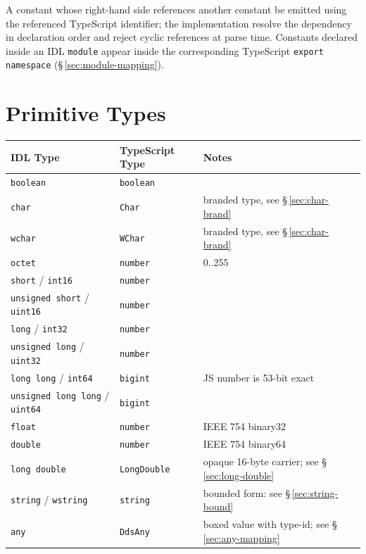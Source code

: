 \documentclass{../styles/zerodds-vendor-spec}
\begin{document}
A constant whose right-hand side references another constant
 be emitted using the referenced TypeScript identifier;
the implementation  resolve the dependency in
declaration order and  reject cyclic references at
parse time. Constants declared inside an IDL \texttt{module}
 appear inside the corresponding TypeScript
\texttt{export namespace} (\S\,\ref{sec:module-mapping}).

\section{Primitive Types}\label{sec:primitive-mapping}

\begin{longtable}{p{3.5cm}p{4cm}p{5cm}}
  \toprule
  \textbf{IDL Type} & \textbf{TypeScript Type} & \textbf{Notes} \\
  \midrule
  \endhead
  \texttt{boolean}                  & \texttt{boolean}    &  \\
  \texttt{char}                     & \texttt{Char}       & branded type, see \S\,\ref{sec:char-brand} \\
  \texttt{wchar}                    & \texttt{WChar}      & branded type, see \S\,\ref{sec:char-brand} \\
  \texttt{octet}                    & \texttt{number}     & 0..255 \\
  \texttt{short} / \texttt{int16}   & \texttt{number}     &  \\
  \texttt{unsigned short} / \texttt{uint16} & \texttt{number} &  \\
  \texttt{long} / \texttt{int32}    & \texttt{number}     &  \\
  \texttt{unsigned long} / \texttt{uint32}  & \texttt{number} &  \\
  \texttt{long long} / \texttt{int64} & \texttt{bigint}   & JS number is 53-bit exact \\
  \texttt{unsigned long long} / \texttt{uint64} & \texttt{bigint} & \\
  \texttt{float}                    & \texttt{number}     & IEEE 754 binary32 \\
  \texttt{double}                   & \texttt{number}     & IEEE 754 binary64 \\
  \texttt{long double}              & \texttt{LongDouble} & opaque 16-byte carrier; see \S\,\ref{sec:long-double} \\
  \texttt{string} / \texttt{wstring} & \texttt{string}    & bounded form: see \S\,\ref{sec:string-bound} \\
  \texttt{any}                      & \texttt{DdsAny}     & boxed value with type-id; see \S\,\ref{sec:any-mapping} \\
  \bottomrule
\end{longtable}
\end{document}
